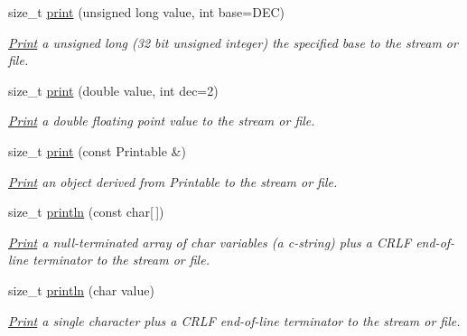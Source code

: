 \begin{DoxyCompactItemize}
size\+\_\+t \mbox{\hyperlink{class_print_acb8c6dcd4339b024436002aa9a6f4be2}{print}} (unsigned long value, int base=D\+EC)
\begin{DoxyCompactList}\small\item\em \mbox{\hyperlink{class_print}{Print}} a unsigned long (32 bit unsigned integer) the specified base to the stream or file. \end{DoxyCompactList}\item 
size\+\_\+t \mbox{\hyperlink{class_print_ad89472bdb6539423a42d350beec02ff4}{print}} (double value, int dec=2)
\begin{DoxyCompactList}\small\item\em \mbox{\hyperlink{class_print}{Print}} a double floating point value to the stream or file. \end{DoxyCompactList}\item 
\mbox{\label{class_print_a901b0f06ae34aab31b8fbb4298f0596e}} 
size\+\_\+t \mbox{\hyperlink{class_print_a901b0f06ae34aab31b8fbb4298f0596e}{print}} (const Printable \&)
\begin{DoxyCompactList}\small\item\em \mbox{\hyperlink{class_print}{Print}} an object derived from Printable to the stream or file. \end{DoxyCompactList}\item 
\mbox{\label{class_print_ad337ce3f7977411b7d34d47a51e5737e}} 
size\+\_\+t \mbox{\hyperlink{class_print_ad337ce3f7977411b7d34d47a51e5737e}{println}} (const char\mbox{[}$\,$\mbox{]})
\begin{DoxyCompactList}\small\item\em \mbox{\hyperlink{class_print}{Print}} a null-\/terminated array of char variables (a c-\/string) plus a C\+R\+LF end-\/of-\/line terminator to the stream or file. \end{DoxyCompactList}\item 
\mbox{\label{class_print_a80fdd92db4b396062586bcb3e08d3835}} 
size\+\_\+t \mbox{\hyperlink{class_print_a80fdd92db4b396062586bcb3e08d3835}{println}} (char value)
\begin{DoxyCompactList}\small\item\em \mbox{\hyperlink{class_print}{Print}} a single character plus a C\+R\+LF end-\/of-\/line terminator to the stream or file. \end{DoxyCompactList}\item 

\end{DoxyCompactItemize}
